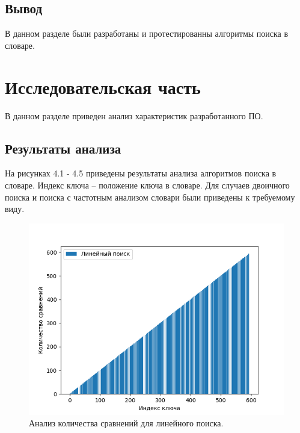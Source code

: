 \documentclass[12pt]{report}
\begin{document}
\section*{Вывод}

В данном разделе были разработаны и протестированны алгоритмы поиска в словаре.

\chapter{Исследовательская часть}

В данном разделе приведен анализ характеристик разработанного ПО.

\section{Результаты анализа}

На рисунках 4.1 - 4.5 приведены результаты анализа алгоритмов поиска в словаре. Индекс ключа -- положение ключа в словаре. Для случаев двоичного поиска и поиска с частотным анализом словари были приведены к требуемому виду.

\begin{figure}[H]
	\centering
	\includegraphics[scale=0.8]{lin_search.png}
	\caption{Анализ количества сравнений для линейного поиска.}
	\label{fig:mpr}
\end{figure}
\end{document}
